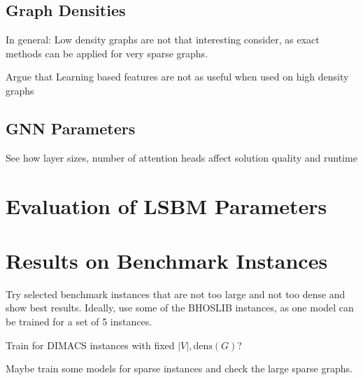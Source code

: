 \documentclass[draft,final]{vutinfth} %
\begin{document}
\subsection{Graph Densities}
In general: Low density graphs are not that interesting consider, as exact methods can be applied for very sparse graphs. 

Argue that Learning based features are not as useful when used on high density graphs

\subsection{GNN Parameters}
See how layer sizes, number of attention heads affect solution quality and runtime 

\section{Evaluation of LSBM Parameters}\label{sec:lsbm}

\section{Results on Benchmark Instances}\label{sec:benchmark-results}
Try selected benchmark instances that are not too large and not too dense and show best results. 
Ideally, use some of the BHOSLIB instances, as one model can be trained for a set of 5 instances. 

Train for DIMACS instances with fixed $|V|, \mathrm{dens}(G)$?

Maybe train some models for sparse instances and check the large sparse graphs. 
\end{document}
